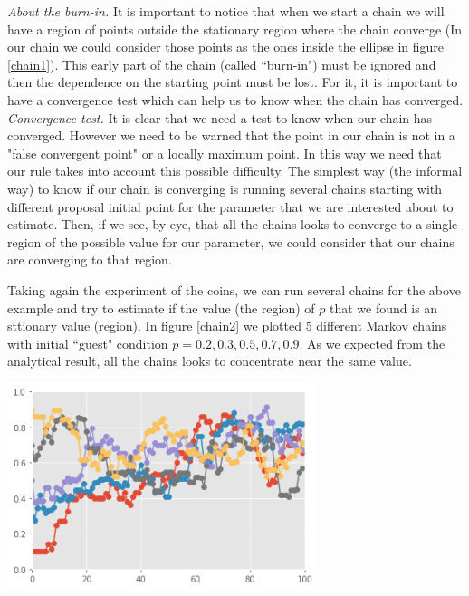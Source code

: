 \documentclass[onecolumn,           %
               showpacs,            %
               preprintnumbers,     %
               aps,                 %
               prl,          	    %
               letterpaper,             %
               superscriptaddress,      %
               nofootinbib,         %
               tightenlines,        %
               floats,floatfix      %
               ,usenatbib,
               ]{revtex4-1}
\begin{document}
\textit{About the burn-in.} It is important to notice that when we start a chain we will have a region of points outside the stationary region where the chain converge (In our chain we could consider those points as the ones inside the ellipse in figure \ref{chain1}). This early part of the chain (called ``burn-in") must be ignored and then the dependence on the starting point must be lost. For it, it is important to have a convergence test which can help us to know when the chain has converged.\\

\textit{Convergence test.} It is clear that we need a test to know when our chain has converged. However we need to be warned that the point in our chain is not in a "false convergent point" or a locally maximum point. In this way we need that our rule takes into account this possible difficulty. The simplest way (the informal way) to know if our chain is converging is running several chains starting with different proposal initial point for the parameter that we are interested about to estimate. Then, if we see, by eye, that all the chains looks to converge to a single region of the possible value for our parameter, we could consider that our chains are converging to that region. 

 Taking again the experiment of the coins, we can run several chains for the above example and try to estimate if the value (the region) of $p$ that we found is an sttionary value (region). In figure \ref{chain2} we plotted 5 different Markov chains with initial ``guest" condition $p=0.2,0.3,0.5,0.7,0.9$. As we expected from the analytical result, all the chains looks to concentrate near the same value.

\begin{minipage}{\textwidth}
\centering
\includegraphics[height=6cm]{chain2.png}
\label{chain2}
\end{minipage}
\end{document}
